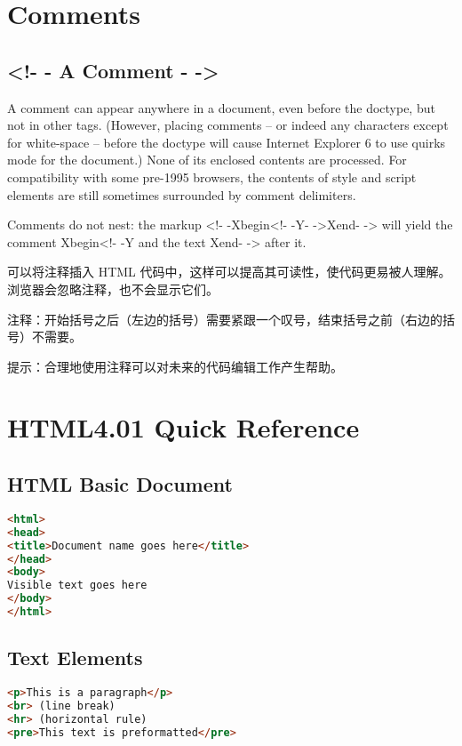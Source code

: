 \chapter{Comments}


\section{<!- - A Comment - ->}

A comment can appear anywhere in a document, even before the doctype, but not in other tags. (However, placing comments – or indeed any characters except for white-space – before the doctype will cause Internet Explorer 6 to use quirks mode for the document.) None of its enclosed contents are processed. For compatibility with some pre-1995 browsers, the contents of style and script elements are still sometimes surrounded by comment delimiters.

Comments do not nest: the markup <!- -Xbegin<!- -Y- ->Xend- -> will yield the comment Xbegin<!- -Y and the text Xend- -> after it.

可以将注释插入 HTML 代码中，这样可以提高其可读性，使代码更易被人理解。浏览器会忽略注释，也不会显示它们。

注释：开始括号之后（左边的括号）需要紧跟一个叹号，结束括号之前（右边的括号）不需要。

提示：合理地使用注释可以对未来的代码编辑工作产生帮助。





\chapter{HTML4.01 Quick Reference}



\section{HTML Basic Document}

\begin{lstlisting}[language=HTML]
<html>
<head>
<title>Document name goes here</title>
</head>
<body>
Visible text goes here
</body>
</html>
\end{lstlisting}

\section{Text Elements}

\begin{lstlisting}[language=HTML]
<p>This is a paragraph</p>
<br> (line break)
<hr> (horizontal rule)
<pre>This text is preformatted</pre>
\end{lstlisting}

